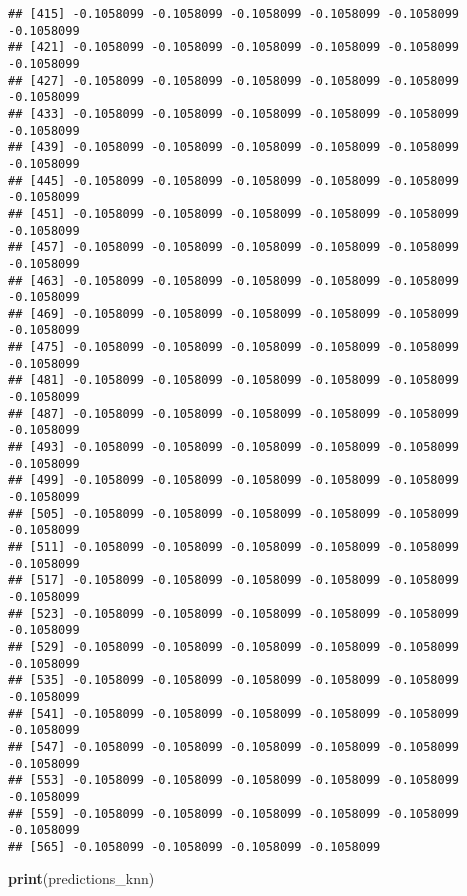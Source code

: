 \documentclass[
]{article}
\newenvironment{Shaded}{\begin{snugshade}}{\end{snugshade}}
\newcommand{\FunctionTok}[1]{\textcolor[rgb]{0.13,0.29,0.53}{\textbf{#1}}}
\newcommand{\NormalTok}[1]{#1}
\begin{document}
\begin{verbatim}
## [415] -0.1058099 -0.1058099 -0.1058099 -0.1058099 -0.1058099 -0.1058099
## [421] -0.1058099 -0.1058099 -0.1058099 -0.1058099 -0.1058099 -0.1058099
## [427] -0.1058099 -0.1058099 -0.1058099 -0.1058099 -0.1058099 -0.1058099
## [433] -0.1058099 -0.1058099 -0.1058099 -0.1058099 -0.1058099 -0.1058099
## [439] -0.1058099 -0.1058099 -0.1058099 -0.1058099 -0.1058099 -0.1058099
## [445] -0.1058099 -0.1058099 -0.1058099 -0.1058099 -0.1058099 -0.1058099
## [451] -0.1058099 -0.1058099 -0.1058099 -0.1058099 -0.1058099 -0.1058099
## [457] -0.1058099 -0.1058099 -0.1058099 -0.1058099 -0.1058099 -0.1058099
## [463] -0.1058099 -0.1058099 -0.1058099 -0.1058099 -0.1058099 -0.1058099
## [469] -0.1058099 -0.1058099 -0.1058099 -0.1058099 -0.1058099 -0.1058099
## [475] -0.1058099 -0.1058099 -0.1058099 -0.1058099 -0.1058099 -0.1058099
## [481] -0.1058099 -0.1058099 -0.1058099 -0.1058099 -0.1058099 -0.1058099
## [487] -0.1058099 -0.1058099 -0.1058099 -0.1058099 -0.1058099 -0.1058099
## [493] -0.1058099 -0.1058099 -0.1058099 -0.1058099 -0.1058099 -0.1058099
## [499] -0.1058099 -0.1058099 -0.1058099 -0.1058099 -0.1058099 -0.1058099
## [505] -0.1058099 -0.1058099 -0.1058099 -0.1058099 -0.1058099 -0.1058099
## [511] -0.1058099 -0.1058099 -0.1058099 -0.1058099 -0.1058099 -0.1058099
## [517] -0.1058099 -0.1058099 -0.1058099 -0.1058099 -0.1058099 -0.1058099
## [523] -0.1058099 -0.1058099 -0.1058099 -0.1058099 -0.1058099 -0.1058099
## [529] -0.1058099 -0.1058099 -0.1058099 -0.1058099 -0.1058099 -0.1058099
## [535] -0.1058099 -0.1058099 -0.1058099 -0.1058099 -0.1058099 -0.1058099
## [541] -0.1058099 -0.1058099 -0.1058099 -0.1058099 -0.1058099 -0.1058099
## [547] -0.1058099 -0.1058099 -0.1058099 -0.1058099 -0.1058099 -0.1058099
## [553] -0.1058099 -0.1058099 -0.1058099 -0.1058099 -0.1058099 -0.1058099
## [559] -0.1058099 -0.1058099 -0.1058099 -0.1058099 -0.1058099 -0.1058099
## [565] -0.1058099 -0.1058099 -0.1058099 -0.1058099
\end{verbatim}

\begin{Shaded}
\begin{Highlighting}[]
\FunctionTok{print}\NormalTok{(predictions\_knn)}
\end{Highlighting}
\end{Shaded}
\end{document}
